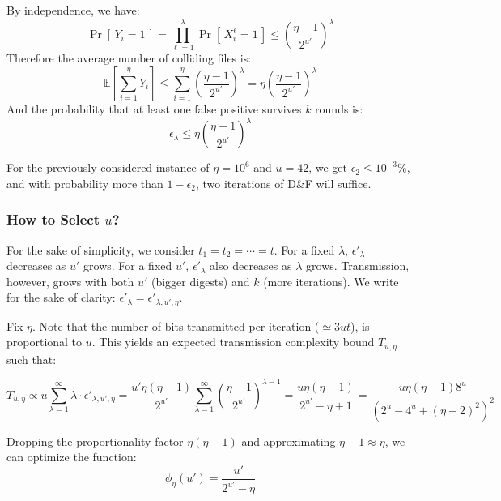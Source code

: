 \documentclass[twoside,envcountsame,runningheads]{llncs}
\newcommand{\Prob}[1]{{\Pr\left[\,{#1}\,\right]}}
\newcommand{\EE}[1]{{\mathbb{E}\left[{#1}\right]}}
\newcommand{\df}{D\&F\xspace}
\begin{document}
By independence, we have:
\[
  \Prob{Y_i = 1} = \prod_{\ell=1}^\lambda \Prob{X^{\ell}_i = 1} \le \left( \frac{\eta -1}{2^{u'}} \right)^\lambda
\]
Therefore the average number of colliding files is:
\[
  \EE{\sum_{i=1}^{\eta} Y_i} \le \sum_{i=1}^{\eta} \left( \frac{\eta -1}{2^{u'}} \right)^\lambda =  \eta \left(\frac{\eta - 1}{2^{u'}}\right)^\lambda
\]
And the probability that at least one false positive survives $k$ rounds is:
\[
  \epsilon_\lambda \le \eta \left(\frac{\eta - 1}{2^{u'}}\right)^\lambda
\]

For the previously considered instance of $\eta=10^6$ and $u=42$, we get $\epsilon_2 \le 10^{-3} \%$, and with probability more than $1-\epsilon_2$, two iterations of \df will suffice.



\subsubsection{How to Select $u$?}

For the sake of simplicity, we consider $t_1=t_2=\cdots=t$.
For a fixed $\lambda$, $\epsilon'_\lambda$ decreases as $u'$ grows. For a fixed $u'$, $\epsilon'_\lambda$ also decreases as $\lambda$ grows. Transmission, however, grows with both $u'$ (bigger digests) and $k$ (more iterations). We write for the sake of clarity: $\epsilon'_\lambda = \epsilon'_{\lambda,u',\eta}$.

Fix $\eta$. Note that the number of bits transmitted per iteration ($\simeq 3ut$), is proportional to $u$. This yields an expected transmission complexity bound $T_{u,\eta}$ such that:

\[T_{u,\eta} 
\propto u \sum_{\lambda=1}^{\infty} \lambda \cdot \epsilon'_{\lambda,u',\eta}
=
\frac{u' \eta (\eta-1)}{2^{u'}} \sum_{\lambda=1}^\infty \left( \frac{\eta-1}{2^{u'}} \right)^{\lambda-1}
=
\frac{ u \eta (\eta-1) }{ 2^{u'} - \eta + 1}
= \frac{u \eta\left(\eta-1\right) 8^u}{\left(2^u-4^u+\left(\eta-2\right)^2\right)^2}
\]


Dropping the proportionality factor $\eta (\eta-1)$ and approximating $\eta-1 \approx \eta$, we can optimize the function:
\[\phi_\eta(u') = \frac{u'}{2^{u'} - \eta} \]
\end{document}
